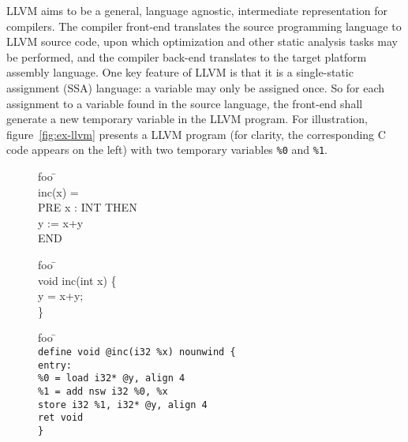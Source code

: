 \documentclass{llncs}
\newcommand{\llvm}[1]{\texttt{#1}}
\newcommand{\B}[1]{\textsf{#1}}
\begin{document}
LLVM aims to be a general, language agnostic, intermediate representation for
compilers. The compiler front-end translates the source programming language to
LLVM source code, upon which optimization and other static analysis tasks may be
performed, and the compiler back-end translates to the target platform assembly
language. One key feature of LLVM is that it is a single-static assignment (SSA)
language: a variable may only be assigned once. So for each assignment to a
variable found in the source language, the front-end shall generate a new
temporary variable in the LLVM program. For illustration,
figure~\ref{fig:ex-llvm} presents a LLVM program (for clarity, the corresponding
C code appears on the left) with two temporary variables \llvm{\%0} and
\llvm{\%1}.
\begin{figure}
\vspace*{-2.4em}
  \begin{minipage}[t]{.3\textwidth}
    \begin{tabbing}
      foo \= \kill  \\
      inc(x) =\\
      \B{PRE} x : INT \B{THEN}   \\
      \> 	y := x+y\\
      \B{END} \\
      \end{tabbing}
  \end{minipage}
  \:\vline\:
  \begin{minipage}[t]{.2\textwidth}
    \begin{tabbing}
      foo \= \kill  \\
      void inc(int x) \{\\
      \> 	y = x+y; \\
      \}\end{tabbing}
  \end{minipage}
	  \:\vline\:
  \begin{minipage}[t]{.6\textwidth}
    \begin{tabbing}
      foo \= \kill  \\
      \llvm{define void @inc(i32 \%x) nounwind \{} \\
      \llvm{entry:}                      \\
      \> \llvm{\%0 = load i32* @y, align 4}     \\
      \> \llvm{\%1 = add nsw i32 \%0, \%x}     \\
      \> \llvm{store i32 \%1, i32* @y, align 4} \\
      \> \llvm{ret void} \\
      \llvm{\}}
    \end{tabbing}


\end{minipage}
\end{figure}
\end{document}

